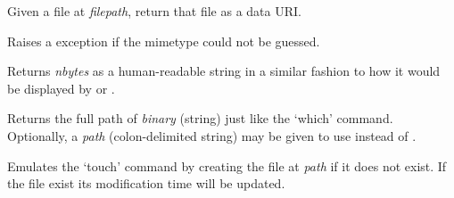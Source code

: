 \documentclass[letterpaper,10pt,openany]{sphinxmanual}
\begin{document}

\begin{fulllineitems}
\label{Developer/utils:gateone.core.utils.create_data_uri}
Given a file at \emph{filepath}, return that file as a data URI.

Raises a {\hyperref[Developer/utils:gateone.core.utils.MimeTypeFail]{}} exception if the mimetype could not be guessed.

\end{fulllineitems}


\begin{fulllineitems}
\label{Developer/utils:gateone.core.utils.human_readable_bytes}
Returns \emph{nbytes} as a human-readable string in a similar fashion to how it
would be displayed by  or .

\end{fulllineitems}


\begin{fulllineitems}
\label{Developer/utils:gateone.core.utils.which}
Returns the full path of \emph{binary} (string) just like the `which' command.
Optionally, a \emph{path} (colon-delimited string) may be given to use instead of
.

\end{fulllineitems}


\begin{fulllineitems}
\label{Developer/utils:gateone.core.utils.touch}
Emulates the `touch' command by creating the file at \emph{path} if it does not
exist.  If the file exist its modification time will be updated.

\end{fulllineitems}

\end{document}
